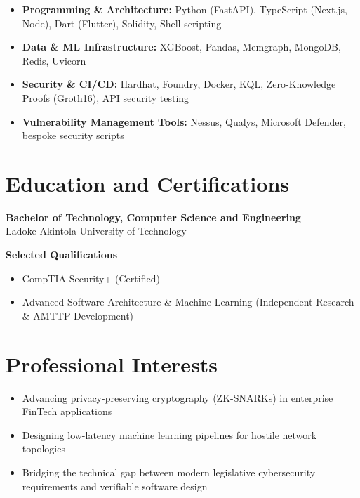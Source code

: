 \documentclass[11pt,a4paper]{article}
\begin{document}
\begin{itemize}
  \item \textbf{Programming \& Architecture:} Python (FastAPI), TypeScript (Next.js, Node), Dart (Flutter), Solidity, Shell scripting
  \item \textbf{Data \& ML Infrastructure:} XGBoost, Pandas, Memgraph, MongoDB, Redis, Uvicorn
  \item \textbf{Security \& CI/CD:} Hardhat, Foundry, Docker, KQL, Zero-Knowledge Proofs (Groth16), API security testing
  \item \textbf{Vulnerability Management Tools:} Nessus, Qualys, Microsoft Defender, bespoke security scripts
\end{itemize}

\section*{Education and Certifications}

\textbf{Bachelor of Technology, Computer Science and Engineering}\\
Ladoke Akintola University of Technology

\textbf{Selected Qualifications}
\begin{itemize}
  \item CompTIA Security+ (Certified)
  \item Advanced Software Architecture \& Machine Learning (Independent Research \& AMTTP Development)
\end{itemize}

\section*{Professional Interests}

\begin{itemize}
  \item Advancing privacy-preserving cryptography (ZK-SNARKs) in enterprise FinTech applications
  \item Designing low-latency machine learning pipelines for hostile network topologies
  \item Bridging the technical gap between modern legislative cybersecurity requirements and verifiable software design
\end{itemize}
\end{document}
